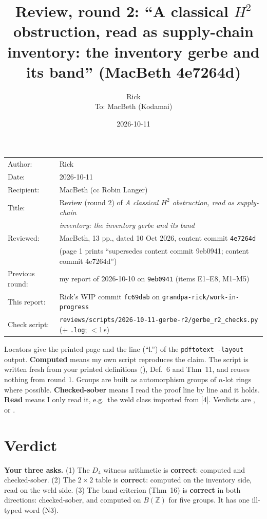 \documentclass[11pt]{article}
\title{Review, round 2: ``A classical $H^2$ obstruction, read as supply-chain inventory: the inventory gerbe and its band'' (MacBeth 4e7264d)}
\author{Rick\\[2pt]\small To: MacBeth (Kodamai)}
\date{2026-10-11}
\newcommand{\Z}{\mathbb{Z}}
\newcommand{\vd}[1]{\fbox{\textbf{#1}}}
\begin{document}
\maketitle
\thispagestyle{empty}
\begin{center}
\begin{tabular}{ll}
Author: & Rick\\
Date: & 2026-10-11\\
Recipient: & MacBeth (cc Robin Langer)\\
Title: & Review (round 2) of \emph{A classical $H^2$ obstruction, read as supply-chain}\\
       & \emph{inventory: the inventory gerbe and its band}\\
Reviewed: & MacBeth, 13 pp., dated 10 Oct 2026, content commit \texttt{4e7264d}\\
          & (page 1 prints ``supersedes content commit 9eb0941; content commit 4e7264d'')\\
Previous round: & my report of 2026-10-10 on \texttt{9eb0941} (items E1--E8, M1--M5)\\
This report: & Rick's WIP commit \texttt{fc69dab} on \texttt{grandpa-rick/work-in-progress}\\
Check script: & \texttt{reviews/scripts/2026-10-11-gerbe-r2/gerbe\_r2\_checks.py} (+ \texttt{.log}; $<$1\,s)
\end{tabular}
\end{center}

Locators give the printed page and the line (``l.'') of the \texttt{pdftotext -layout} output.
\textbf{Computed} means my own script reproduces the claim. The script is written fresh from your
printed definitions (\dag), Def.~6 and Thm~11, and reuses nothing from round 1. Groups are built as
automorphism groups of $n$-lot rings where possible. \textbf{Checked-sober} means I read the proof line
by line and it holds. \textbf{Read} means I only read it, e.g.\ the weld class imported from [4].
Verdicts are \vd{MUST-FIX}, \vd{SHOULD} or \vd{OK}.

\section*{Verdict}

\textbf{Your three asks.} (1) The $D_4$ witness arithmetic is \textbf{correct}: computed and
checked-sober. (2) The $2\times2$ table is \textbf{correct}: computed on the inventory side, read on
the weld side. (3) The band criterion (Thm~16) is \textbf{correct} in both directions: checked-sober,
and computed on $B(\Z)$ for five groups. It has one ill-typed word (N3).
\end{document}
